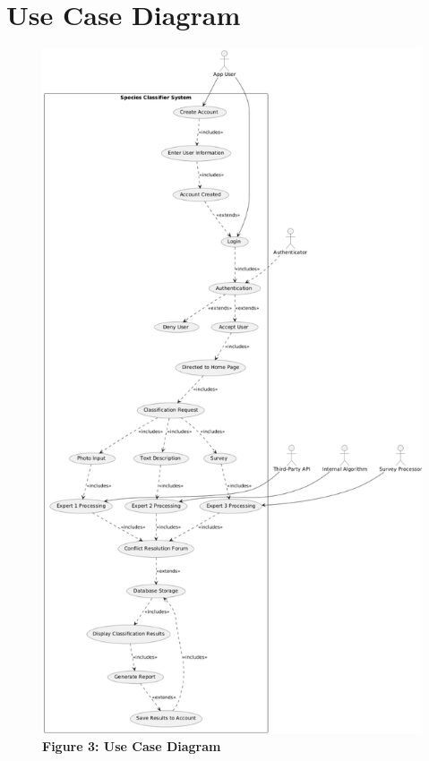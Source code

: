 \documentclass[]{article}
\begin{document}
\section{Use Case Diagram}
\begin{figure}[H]
    \centering
    \includegraphics[width=1\textwidth, height=1.25\textwidth]{3Diagram.png}
    \caption*{\textbf{Figure 3: Use Case Diagram}}
\end{figure}

\end{document}
